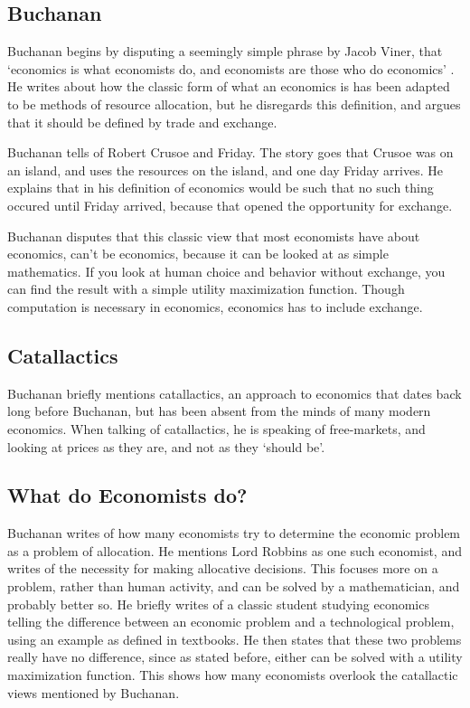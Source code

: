 \documentclass[11pt,]{article}
\begin{document}
\subsection{Buchanan}\label{buchanan-1}

Buchanan begins by disputing a seemingly simple phrase by Jacob Viner,
that `economics is what economists do, and economists are those who do
economics' \citet{Buchanan1979}. He writes about how the classic form of
what an economics is has been adapted to be methods of resource
allocation, but he disregards this definition, and argues that it should
be defined by trade and exchange.

Buchanan tells of Robert Crusoe and Friday. The story goes that Crusoe
was on an island, and uses the resources on the island, and one day
Friday arrives. He explains that in his definition of economics would be
such that no such thing occured until Friday arrived, because that
opened the opportunity for exchange.

Buchanan disputes that this classic view that most economists have about
economics, can't be economics, because it can be looked at as simple
mathematics. If you look at human choice and behavior without exchange,
you can find the result with a simple utility maximization function.
Though computation is necessary in economics, economics has to include
exchange.

\subsection{Catallactics}\label{catallactics}

Buchanan briefly mentions catallactics, an approach to economics that
dates back long before Buchanan, but has been absent from the minds of
many modern economics. When talking of catallactics, he is speaking of
free-markets, and looking at prices as they are, and not as they `should
be'.

\subsection{What do Economists do?}\label{what-do-economists-do}

Buchanan writes of how many economists try to determine the economic
problem as a problem of allocation. He mentions Lord Robbins as one such
economist, and writes of the necessity for making allocative decisions.
This focuses more on a problem, rather than human activity, and can be
solved by a mathematician, and probably better so. He briefly writes of
a classic student studying economics telling the difference between an
economic problem and a technological problem, using an example as
defined in textbooks. He then states that these two problems really have
no difference, since as stated before, either can be solved with a
utility maximization function. This shows how many economists overlook
the catallactic views mentioned by Buchanan.
\end{document}

